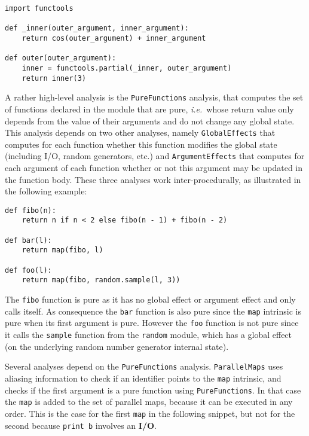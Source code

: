 \documentclass[10pt, onecolumn, preprint]{sigplanconf}
\providecommand{\ie}[1][~]{\textit{i.e.}#1}
\begin{document}
\begin{lstlisting}
import functools

def _inner(outer_argument, inner_argument):
    return cos(outer_argument) + inner_argument

def outer(outer_argument):
    inner = functools.partial(_inner, outer_argument)
    return inner(3)
\end{lstlisting}

A rather high-level analysis is the \texttt{PureFunctions} analysis, that computes the
set of functions declared in the module that are pure, \ie{whose return value
only depends from the value of their arguments and do not change any global state}.
This analysis depends on two
other analyses, namely \texttt{GlobalEffects} that computes for each function whether
this function modifies the global state (including I/O, random generators, etc.)
and \texttt{ArgumentEffects} that computes for each argument of each function 
whether or not this argument may be updated in the function body. These three
analyses work inter-procedurally, as illustrated in the following example:

\begin{lstlisting}
def fibo(n):
    return n if n < 2 else fibo(n - 1) + fibo(n - 2)

def bar(l):
    return map(fibo, l)

def foo(l):
    return map(fibo, random.sample(l, 3))
\end{lstlisting}

The \texttt{fibo} function is pure as it has no global effect or argument effect and
only calls itself. As consequence the \texttt{bar} function is also pure since the
\texttt{map} intrinsic is pure when its first argument is pure. However the \texttt{foo}
function is not pure since it calls the \texttt{sample} function from the \texttt{random}
module, which has a global effect (on the underlying random number generator
internal state).

Several analyses depend on the \texttt{PureFunctions} analysis.
\texttt{ParallelMaps} uses aliasing information to check if an identifier
points to the \texttt{map} intrinsic, and checks if the first argument is a
pure function using \texttt{PureFunctions}. In that case the \texttt{map} is
added to the set of parallel maps, because it can be executed in any order.
This is the case for the first \texttt{map} in the following snippet, but not
for the second because \texttt{print b} involves an \textbf{I/O}.
\end{document}
